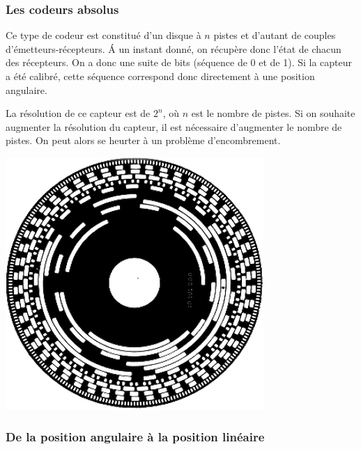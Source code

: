 \documentclass[10pt]{article}
\begin{document}
\subsubsection{Les codeurs absolus}

\begin{minipage}[c]{.6\linewidth}
Ce type de codeur est constitué d'un disque à $n$ pistes et d'autant de couples d'émetteurs-récepteurs. \'A un instant donné, on récupère donc l'état de chacun des récepteurs. On a donc une suite de bits (séquence de 0 et de 1). Si la capteur a été calibré, cette séquence correspond donc directement à une position angulaire. 

La résolution de ce capteur est de $2^n$, où $n$ est le nombre de pistes. Si on souhaite augmenter la résolution du capteur, il est nécessaire d'augmenter le nombre de pistes. On peut alors se heurter à un problème d'encombrement. 
\end{minipage}\hfill
\begin{minipage}[c]{.35\linewidth}
\begin{center}
    \includegraphics[width=.9\textwidth]{images/codeur_abs.png}
\end{center}
\end{minipage}

\subsubsection{De la position angulaire à la position linéaire}
\end{document}

